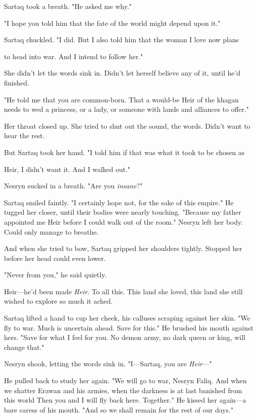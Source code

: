 Sartaq took a breath. "He asked me why."

"I hope you told him that the fate of the world might depend upon it."

Sartaq chuckled. "I did. But I also told him that the woman I love now plans

to head into war. And I intend to follow her."

She didn't let the words sink in. Didn't let herself believe any of it, until he'd finished.

"He told me that you are common-born. That a would-be Heir of the khagan needs to wed a princess, or a lady, or someone with lands and alliances to offer."

Her throat closed up. She tried to shut out the sound, the words. Didn't want to hear the rest.

But Sartaq took her hand. "I told him if that was what it took to be chosen as

Heir, I didn't want it. And I walked out."

Nesryn sucked in a breath. "Are you \emph{insane}?"

Sartaq smiled faintly. "I certainly hope not, for the sake of this empire." He tugged her closer, until their bodies were nearly touching. "Because my father appointed me Heir before I could walk out of the room." Nesryn left her body. Could only manage to breathe.

And when she tried to bow, Sartaq gripped her shoulders tightly. Stopped her before her head could even lower.

"Never from you," he said quietly.

Heir---he'd been made \emph{Heir}. To all this. This land she loved, this land she still wished to explore so much it ached.

Sartaq lifted a hand to cup her cheek, his calluses scraping against her skin. "We fly to war. Much is uncertain ahead. Save for this." He brushed his mouth against hers. "Save for what I feel for you. No demon army, no dark queen or king, will change that."

Nesryn shook, letting the words sink in. "I---Sartaq, you are
\emph{Heir}---"

He pulled back to study her again. "We will go to war, Nesryn Faliq. And when we shatter Erawan and his armies, when the darkness is at last banished from this world  Then you and I will fly back here. Together." He kissed her again---a bare caress of his mouth. "And so we shall remain for the rest of our days."

